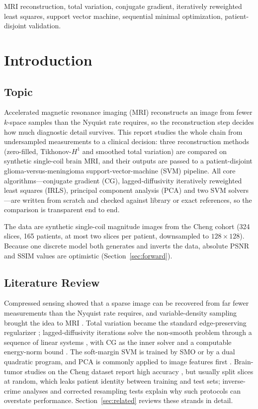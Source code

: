 \documentclass[conference,a4paper]{IEEEtran}
\begin{document}
\begin{IEEEkeywords}
MRI reconstruction, total variation, conjugate gradient, iteratively reweighted least squares, support vector machine, sequential minimal optimization, patient-disjoint validation.
\end{IEEEkeywords}

\section{Introduction}

\subsection{Topic}
Accelerated magnetic resonance imaging (MRI) reconstructs an image from fewer $k$-space samples than the Nyquist rate requires, so the reconstruction step decides how much diagnostic detail survives. This report studies the whole chain from undersampled measurements to a clinical decision: three reconstruction methods (zero-filled, Tikhonov-$H^1$ and smoothed total variation) are compared on synthetic single-coil brain MRI, and their outputs are passed to a patient-disjoint glioma-versus-meningioma support-vector-machine (SVM) pipeline. All core algorithms---conjugate gradient (CG), lagged-diffusivity iteratively reweighted least squares (IRLS), principal component analysis (PCA) and two SVM solvers---are written from scratch and checked against library or exact references, so the comparison is transparent end to end.

The data are synthetic single-coil magnitude images from the Cheng cohort (324 slices, 165 patients, at most two slices per patient, downsampled to $128\times128$). Because one discrete model both generates and inverts the data, absolute PSNR and SSIM values are optimistic (Section~\ref{sec:forward}).

\subsection{Literature Review}
Compressed sensing showed that a sparse image can be recovered from far fewer measurements than the Nyquist rate requires, and variable-density sampling brought the idea to MRI \cite{lustig,donoho}. Total variation became the standard edge-preserving regularizer \cite{rudin}; lagged-diffusivity iterations solve the non-smooth problem through a sequence of linear systems \cite{vogel,dobson}, with CG as the inner solver and a computable energy-norm bound \cite{hestenes,shewchuk}. The soft-margin SVM \cite{cortes} is trained by SMO \cite{platt,fan,libsvm} or by a dual quadratic program, and PCA is commonly applied to image features first \cite{jolliffe}. Brain-tumor studies on the Cheng dataset report high accuracy \cite{cheng}, but usually split slices at random, which leaks patient identity between training and test sets; inverse-crime analyses \cite{kaipio,shimron} and corrected resampling tests \cite{nadeau,holm} explain why such protocols can overstate performance. Section~\ref{sec:related} reviews these strands in detail.
\end{document}
